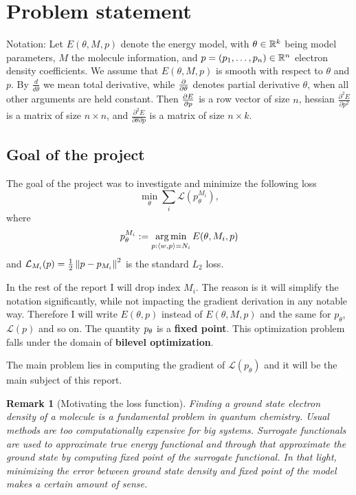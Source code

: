 \documentclass[a4paper,10.5pt]{report}
\newtheorem{remark}{Remark}
\begin{document}
\newpage

\section{Problem statement}
Notation: Let $E(\theta, M ,p)$ denote the energy model, with $\theta \in \mathbb{R}^k$ being model parameters, $M$ the molecule information, and $p=(p_1, \ldots ,p_n )\in \mathbb{R}^n$ electron density coefficients.  We assume that $E(\theta, M ,p)$ is smooth with respect to $\theta$ and $p$.
By $\frac{d}{d\theta}$ we mean total derivative, while $\frac{\partial }{\partial \theta}$ denotes partial derivative $\theta$, when all other arguments are held constant. Then $\frac{\partial E}{\partial p}$ is a row vector of size $n$, hessian $\frac{\partial^2 E}{ \partial p^2 }$ is a matrix of size $n \times n$, and $\frac{\partial^2 E}{\partial \theta \partial p}$ is a matrix of size $n \times k $.


\subsection{Goal of the project}
The goal of the project was to investigate and minimize the following loss
\begin{equation}\label{bilevel}
 \min_\theta \sum_i \mathcal{L}(p_{\theta}^{M_i}),
\end{equation}
where
\begin{equation}
  p_\theta^{M_i}:=\operatorname*{arg\,min}_{p : \langle w, p \rangle=N_i} E(\theta,M_i,p)
\end{equation}
and $\mathcal{L}_{M_i}(p) = \frac{1}{2}\left\|p-p_{M_i}\right\|^2$ is the standard $L_2$ loss.

In the rest of the report I will drop index $M_i$. The reason is it will simplify the notation significantly, while not impacting the gradient derivation in any notable way.
Therefore I will write $E(\theta,p)$ instead of $E(\theta,M,p)$ and the same for $p_\theta$, $\mathcal{L}(p)$ and so on.
The quantity $p_\theta$ is a \textbf{fixed point}.
This optimization problem falls under the domain of \textbf{bilevel optimization}.

The main problem lies in computing the gradient of $\mathcal{L}(p_\theta)$ and it will be the main subject of this report.

\begin{remark}[Motivating the loss function] Finding a ground state electron density of a molecule is a fundamental problem in quantum chemistry. Usual methods are too computationally expensive for big systems. Surrogate functionals are used to approximate true energy functional and through that approximate the ground state by computing fixed point of the surrogate functional. In that light, minimizing the error between ground state density and fixed point of the model makes a certain amount of sense.
\end{remark}
\end{document}
